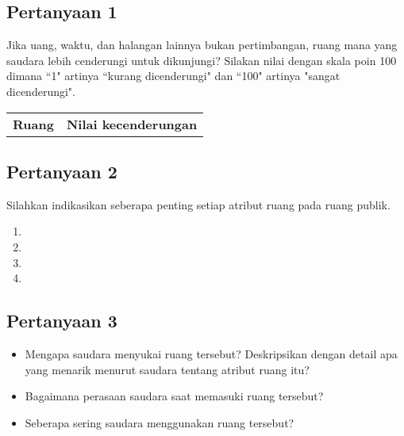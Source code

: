 \subsection*{Pertanyaan 1}
Jika uang, waktu, dan halangan lainnya bukan pertimbangan, ruang mana yang saudara lebih cenderungi untuk dikunjungi? Silakan nilai dengan skala poin 100  dimana ``1" artinya ``kurang dicenderungi" dan ``100" artinya "sangat dicenderungi".

    \begin{tabular}{p{} c}
    \textbf{Ruang} & \textbf{Nilai kecenderungan}\\
    \end{tabular}
\vspace{10pt}



\subsection*{Pertanyaan 2}
Silahkan indikasikan seberapa penting setiap atribut ruang pada ruang publik.

\begin{enumerate}[leftmargin=1em]
    \item {}
\item {}

\item {}

\item {}
\end{enumerate}

\subsection*{Pertanyaan 3}
\begin{itemize}
    \item Mengapa saudara menyukai ruang tersebut? Deskripsikan dengan detail apa yang menarik menurut saudara tentang atribut ruang itu?

    \item Bagaimana perasaan saudara saat memasuki ruang tersebut?
\end{itemize}
\begin{itemize}
    \item Seberapa sering saudara menggunakan ruang tersebut?
\end{itemize}

